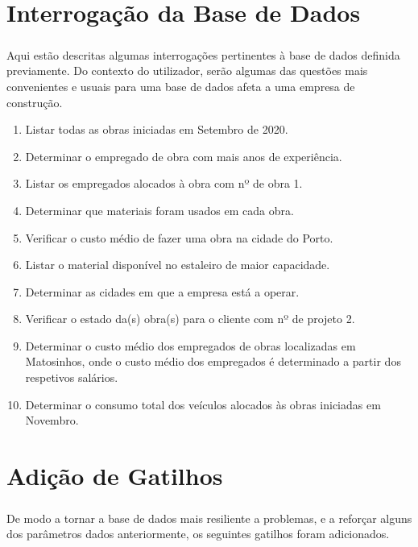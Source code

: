 \documentclass{report}
\begin{document}
	\chapter{Interrogação da Base de Dados}
		
		\paragraph{}Aqui estão descritas algumas interrogações pertinentes à base de dados
		definida previamente. Do contexto do utilizador, serão algumas das questões
		mais convenientes e usuais para uma base de dados afeta a uma empresa de construção.\\	
		
		\begin{enumerate}
			\item Listar todas as obras iniciadas em Setembro de 2020.
			\item Determinar o empregado de obra com mais anos de experiência.
			\item Listar os empregados alocados à obra com nº de obra 1.
			\item Determinar que materiais foram usados em cada obra.
			\item Verificar o custo médio de fazer uma obra na cidade do Porto.
			\item Listar o material disponível no estaleiro de maior capacidade.
			\item Determinar as cidades em que a empresa está a operar.
			\item Verificar o estado da(s) obra(s) para o cliente com nº de projeto 2.
			\item Determinar o custo médio dos empregados de obras localizadas em Matosinhos,
			onde o custo médio dos empregados é determinado a partir dos respetivos salários.
			\item Determinar o consumo total dos veículos alocados às obras iniciadas em 
			Novembro.
		\end{enumerate}		
	\chapter{Adição de Gatilhos}
		
		\paragraph{}De modo a tornar a base de dados mais resiliente a problemas, e a reforçar
		alguns dos parâmetros dados anteriormente, os seguintes gatilhos foram adicionados.
		
\end{document}

